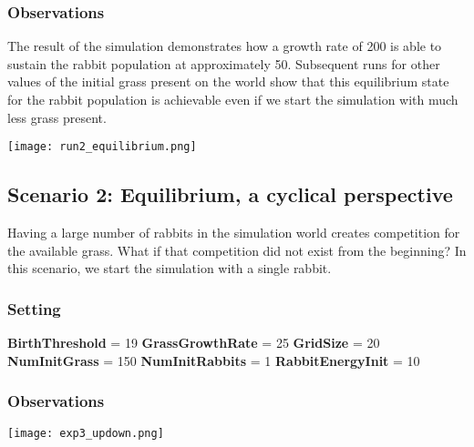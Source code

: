 \documentclass[11pt]{article}
\begin{document}
\begin{multicols}{2}
\subsubsection{Observations}


The result of the simulation demonstrates how a growth rate of 200 is able to sustain the rabbit population at approximately 50. Subsequent runs for other values of the initial grass present on the world show that this equilibrium state for the rabbit population is achievable even if we start the simulation with much less grass present.

\texttt{[image: run2\_equilibrium.png]}


\end{multicols}

\subsection{Scenario 2: Equilibrium, a cyclical perspective}
Having a large number of rabbits in the simulation world creates competition for the available grass. What if that competition did not exist from the beginning? In this scenario, we start the simulation with a single rabbit.

\begin{multicols}{2}

\subsubsection{Setting}
\textbf{BirthThreshold} = 19 \newline
\textbf{GrassGrowthRate} = 25 \newline
\textbf{GridSize} = 20 \newline
\textbf{NumInitGrass} = 150 \newline
\textbf{NumInitRabbits} = 1  \newline
\textbf{RabbitEnergyInit} = 10 \newline

\subsubsection{Observations}
\texttt{[image: exp3\_updown.png]}

\end{multicols}
\end{document}
